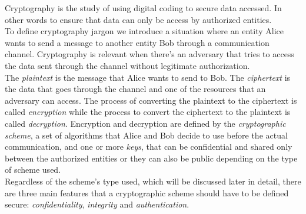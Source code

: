 Cryptography is the study of using digital coding to secure data accessed. In other words to ensure that data can only be access by authorized entities.\\
To define cryptography jargon we introduce a situation where an entity Alice wants to send a message to another entity Bob through a communication channel. Cryptography is relevant when there's an adversary that tries to access the data sent through the channel without legitimate authorization.\\
The \emph{plaintext} is the message that Alice wants to send to Bob. The \emph{ciphertext} is the data that goes through the channel and one of the resources that an adversary can access.
The process of converting the plaintext to the ciphertext is called \emph{encryption} while the process to convert the ciphertext to the plaintext is called \emph{decryption}.
Encryption and decryption are defined by the \emph{cryptographic scheme}, a set of algorithms that Alice and Bob decide to use before the actual communication, and one or more \emph{keys}, that can be confidential and shared only between the authorized entities or they can also be public depending on the type of scheme used.\\
Regardless of the scheme's type used, which will be discussed later in detail, there are three main features that a cryptographic scheme should have to be defined secure: \emph{confidentiality}, \emph{integrity} and \emph{authentication}.
